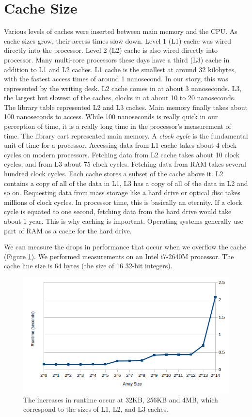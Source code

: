 \section*{Cache Size}
Various levels of caches were inserted between main memory and the CPU.
As cache sizes grow, their access times slow down.
Level 1 (L1) cache was wired directly into the processor.  Level 2 (L2) cache is also wired directly into processor.
Many multi-core processors these days have a third (L3) cache in addition to L1 and L2 caches.
L1 cache is the smallest at around 32 kilobytes, with the fastest access times of around 1 nanosecond.
In our story, this was represented by the writing desk.
L2 cache comes in at about 3 nanoseconds.  L3, the largest but slowest of the caches, clocks in at about 10 to 20 nanoseconds.
The library table represented L2 and L3 caches.
Main memory finally takes about 100 nanoseconds to access.  While 100 nanoseconds is really quick in our perception of time, it is a really long time in the processor's measurement of time.
The library cart represented main memory.
A \emph{clock cycle} is the fundamental unit of time for a processor.
Accessing data from L1 cache takes about 4 clock cycles on modern processors.  Fetching data from L2 cache takes about 10 clock cycles, and from L3 about 75 clock cycles.
Fetching data from RAM takes several hundred clock cycles.
Each cache stores a subset of the cache above it.  L2 contains a copy of all of the data in L1, L3 has a copy of all of the data in L2 and so on.
Requesting data from mass storage like a hard drive or optical disc takes millions of clock cycles.  In processor time, this is basically an eternity.
If a clock cycle is equated to one second, fetching data from the hard drive would take about 1 year.
This is why caching is important.  Operating systems generally use part of RAM as a cache for the hard drive.

We can measure the drops in performance that occur when we overflow the cache (Figure \ref{fig:cachesizes}).
We performed measurements on an Intel i7-2640M processor.  The cache line size is 64 bytes (the size of 16 32-bit integers).
\begin{figure}[h]
\centering
\includegraphics[width=\textwidth]{cache_size.png}
\caption{The increases in runtime occur at 32KB, 256KB and 4MB, which correspond to the sizes of L1, L2, and L3 caches.}
\label{fig:cachesizes}
\end{figure}

